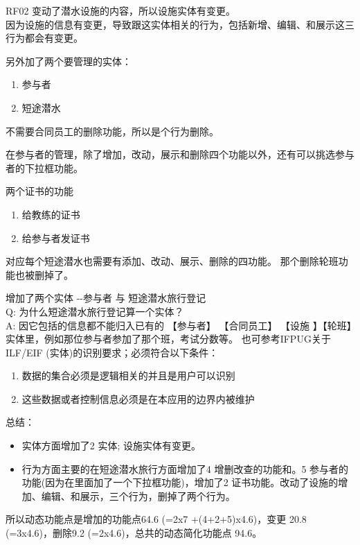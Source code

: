 RF02 变动了潜水设施的内容，所以设施实体有变更。\\
因为设施的信息有变更，导致跟这实体相关的行为，包括新增、编辑、和展示这三行为都会有变更。

另外加了两个要管理的实体：

\begin{enumerate}
\tightlist
\item
  参与者
\item
  短途潜水
\end{enumerate}

不需要合同员工的删除功能，所以是个行为删除。

在参与者的管理，除了增加，改动，展示和删除四个功能以外，还有可以挑选参与者的下拉框功能。

两个证书的功能

\begin{enumerate}
\tightlist
\item
  给教练的证书
\item
  给参与者发证书
\end{enumerate}

对应每个短途潜水也需要有添加、改动、展示、删除的四功能。
那个删除轮班功能也被删掉了。

增加了两个实体 -\/-参与者 与 短途潜水旅行登记\\
Q: 为什么短途潜水旅行登记算一个实体？\\
A: 因它包括的信息都不能归入已有的 【参与者】 【合同员工】 【设施
】【轮班】实体里，例如那位参与者参加了那个班，考试分数等。
也可参考IFPUG关于ILF/EIF (实体)的识别要求；必须符合以下条件：

\begin{enumerate}
\tightlist
\item
  数据的集合必须是逻辑相关的并且是用户可以识别
\item
  这些数据或者控制信息必须是在本应用的边界内被维护
\end{enumerate}

总结：

\begin{itemize}
\tightlist
\item
  实体方面增加了2 实体; 设施实体有变更。
\item
  行为方面主要的在短途潜水旅行方面增加了4 增删改查的功能和。5
  参与者的功能(因为在里面加了一个下拉框功能)，增加了2
  证书功能。改动了设施的增加、编辑、和展示，三个行为，删掉了两个行为。
\end{itemize}

所以动态功能点是增加的功能点64.6 (=2x7 +(4+2+5)x4.6)，变更 20.8
(=3x4.6)，删除9.2 (=2x4.6)，总共的动态简化功能点 94.6。

